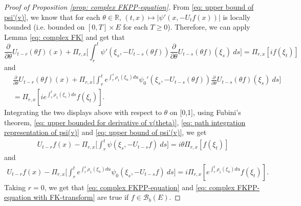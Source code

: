 \documentclass[EJP]{ejpecp} %
\begin{document}
\begin{proof}[Proof of Proposition \ref{prop: complex FKPP-equation}]
  From \eqref{eq: upper bound of psi'(v)}, we know that for each $\theta\in \mathbb R$, $(t,x) \mapsto |\psi'(x,-U_tf(x))|$ is locally bounded (i.e. bounded on $[0,T]\times E$ for each $T \geq 0$).
  Therefore, we can apply Lemma \ref{eq: complex FK} and get that
  \[
    \frac{\partial}{\partial \theta} U_{t-r}(\theta f)(x) + \Pi_{r,x} \Big[\int_r^t \psi' (\xi_s,- U_{t-s}(\theta f) )\frac{\partial}{\partial \theta} U_{t-s}(\theta f)(\xi_s)~ds\Big]
    = \Pi_{r,x} [i f(\xi_t)]
  \]
  and
  \begin{align}
    & \frac{\partial}{\partial \theta} U_{t-r}(\theta f)(x) + \Pi_{r,x} \Big[\int_r^t e^{\int_r^s \rho_1(\xi_u)du}\psi_0' (\xi_s,- U_{t-s}(\theta f) )\frac{\partial}{\partial \theta} U_{t-s}(\theta f)(\xi_s)~ds\Big]\\
    & = \Pi_{r,x} [i e^{\int_r^t \rho_1(\xi_s)ds}f(\xi_t)].
  \end{align}
  Integrating the two displays above with respect to $\theta$  on [0,1], using
  Fubini's theorem, \eqref{eq: upper bounded for derivative of v(theta)}, \eqref{eq: path integration representation of psi(v)} and \eqref{eq: upper bound of psi'(v)}, we get
  \begin{align}
    U_{t-r}f(x) - \Pi_{r,x} \Big[\int_r^t \psi (\xi_s,-U_{t-s}f ) ~ds\Big]
    = i \theta \Pi_{r,x} [f(\xi_t)]
  \end{align}
  and
  \begin{align}
    U_{t-r}f(x) - \Pi_{r,x} \Big[\int_r^t e^{\int_r^s \rho_1(\xi_u)du} \psi_0 (\xi_s,- U_{t-s}f ) ~ds\Big]
    = i \Pi_{r,x} [e^{\int_r^t\rho_1(\xi_u)du}f(\xi_t)].
  \end{align}
  Taking $r = 0$, we get that \eqref{eq: complex FKPP-equation} and \eqref{eq: complex FKPP-equation with FK-transform} are true if $f\in \mathcal B_b(E)$.


\end{proof}
\end{document}
